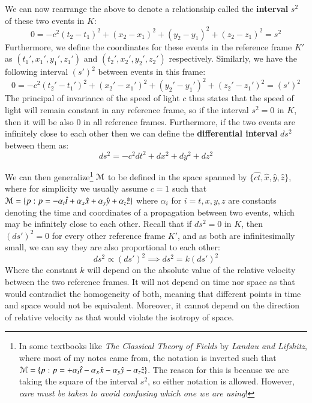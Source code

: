 \documentclass{article}
\begin{document}
			We can now rearrange the above to denote a relationship called the \textbf{interval} $s^2$ of these two events in $K$:
			\begin{equation}
				\label{eq:Interval}
				\boxed{0 = - c^2 (t_2 - t_1)^2 + (x_2 - x_1)^2 + (y_2 - y_1)^2 + (z_2 - z_1)^2 = s^2}
			\end{equation}
			Furthermore, we define the coordinates for these events in the reference frame $K'$ as $(t_1', x_1', y_1', z_1')$ and $(t_2', x_2', y_2', z_2')$ respectively. Similarly, we have the following interval $(s')^2$ between events in this frame:
			$$ 0 = - c^2 (t_2' - t_1')^2 + (x_2' - x_1')^2 + (y_2' - y_1')^2 + (z_2' - z_1')^2 = (s')^2$$
			The principal of invariance of the speed of light $c$ thus states that the speed of light will remain constant in any reference frame, so if the interval $s^2 = 0$ in $K$, then it will be also 0 in all reference frames. Furthermore, if the two events are infinitely close to each other then we can define the \textbf{differential interval} $ds^2$ between them as:
			\begin{equation}
				\label{eq:IntervalDifferential}
				\boxed{ds^2 =  - c^2 dt^2 + dx^2 + dy^2 + dz^2}
			\end{equation}
		
			\pagebreak
		
			We can then generalize\footnote{In some textbooks like \textit{The Classical Theory of Fields} by \textit{Landau and Lifshitz}, where most of my notes came from, the notation is inverted such that $\mathcal{M} = \{ p: p = +\alpha_t \hat{t} - \alpha_x \hat{x} - \alpha_y \hat{y} - \alpha_z \hat{z} \}$. The reason for this is because we are taking the square of the interval $s^2$, so either notation is allowed. However, \textit{care must be taken to avoid confusing which one we are using}!} $\mathcal{M}$ to be defined in the space spanned by $\{ \hat{ct}, \hat{x}, \hat{y}, \hat{z}\}$, where for simplicity we usually assume $c=1$ such that $\mathcal{M} = \{ p: p = -\alpha_t \hat{t} + \alpha_x \hat{x} + \alpha_y \hat{y} + \alpha_z \hat{z} \}$ where $\alpha_i$ for $i = t,x,y,z$ are constants denoting the time and coordinates of a propagation between two events, which may be infinitely close to each other. Recall that if $ds^2 = 0$ in $K$, then $(ds')^2 = 0$ for every other reference frame $K'$, and as both are infinitesimally small, we can say they are also proportional to each other:
			$$ ds^2 \propto (ds')^2 \implies ds^2 = k (ds')^2$$
			Where the constant $k$ will depend on the absolute value of the relative velocity between the two reference frames. It will not depend on time nor space as that would contradict the homogeneity of both, meaning that different points in time and space would not be equivalent. Moreover, it cannot depend on the direction of relative velocity as that would violate the isotropy of space.
			
\end{document}
